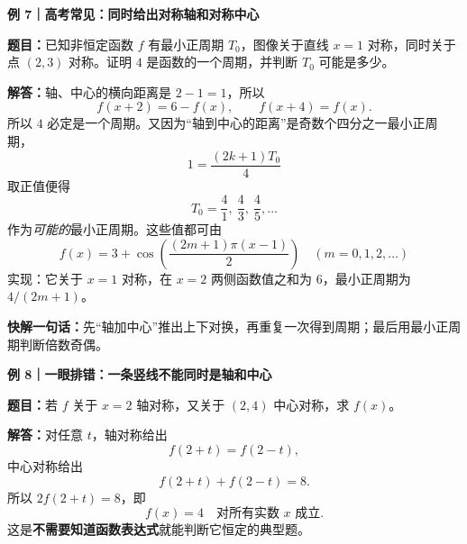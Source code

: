 \clearpage
\begin{examplebox}
\textbf{\textcolor{CExample}{例 7｜高考常见：同时给出对称轴和对称中心}}



\textbf{题目：}已知非恒定函数 $f$ 有最小正周期 $T_0$，图像关于直线 $x=1$ 对称，同时关于点 $(2,3)$ 对称。证明 $4$ 是函数的一个周期，并判断 $T_0$ 可能是多少。

\textbf{解答：}轴、中心的横向距离是 $2-1=1$，所以
\[
f(x+2)=6-f(x),\qquad f(x+4)=f(x).
\]
所以 $4$ 必定是一个周期。又因为“轴到中心的距离”是奇数个四分之一最小正周期，
\[
1=\frac{(2k+1)T_0}{4}
\]
取正值便得
\[
\boxed{T_0=\frac4{1},\ \frac4{3},\ \frac4{5},\ldots}
\]
作为\emph{可能的}最小正周期。这些值都可由
\[
f(x)=3+\cos\left(\frac{(2m+1)\pi(x-1)}{2}\right)
\quad(m=0,1,2,\ldots)
\]
实现：它关于 $x=1$ 对称，在 $x=2$ 两侧函数值之和为 $6$，最小正周期为 $4/(2m+1)$。

\textbf{快解一句话：}先“轴加中心”推出上下对换，再重复一次得到周期；最后用最小正周期判断倍数奇偶。

\medskip

\end{examplebox}
\clearpage
\begin{examplebox}
\textbf{\textcolor{CExample}{例 8｜一眼排错：一条竖线不能同时是轴和中心}}



\textbf{题目：}若 $f$ 关于 $x=2$ 轴对称，又关于 $(2,4)$ 中心对称，求 $f(x)$。

\textbf{解答：}对任意 $t$，轴对称给出
\[
f(2+t)=f(2-t),
\]
中心对称给出
\[
f(2+t)+f(2-t)=8.
\]
所以 $2f(2+t)=8$，即
\[
\boxed{f(x)=4\quad\text{对所有实数 $x$ 成立}.}
\]
这是\textbf{不需要知道函数表达式}就能判断它恒定的典型题。
\end{examplebox}
